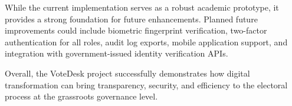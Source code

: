 While the current implementation serves as a robust academic prototype, it provides a strong foundation for future enhancements. Planned future improvements could include biometric fingerprint verification, two-factor authentication for all roles, audit log exports, mobile application support, and integration with government-issued identity verification APIs.

Overall, the VoteDesk project successfully demonstrates how digital transformation can bring transparency, security, and efficiency to the electoral process at the grassroots governance level.
